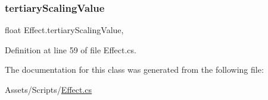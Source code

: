 \subsubsection{\texorpdfstring{tertiaryScalingValue}{tertiaryScalingValue}}
{\footnotesize\ttfamily float Effect.\+tertiary\+Scaling\+Value\hspace{0.3cm}{\ttfamily [get]}, {\ttfamily [set]}}



Definition at line 59 of file Effect.\+cs.



The documentation for this class was generated from the following file\+:\begin{DoxyCompactItemize}
\item 
Assets/\+Scripts/\mbox{\hyperlink{_effect_8cs}{Effect.\+cs}}\end{DoxyCompactItemize}
